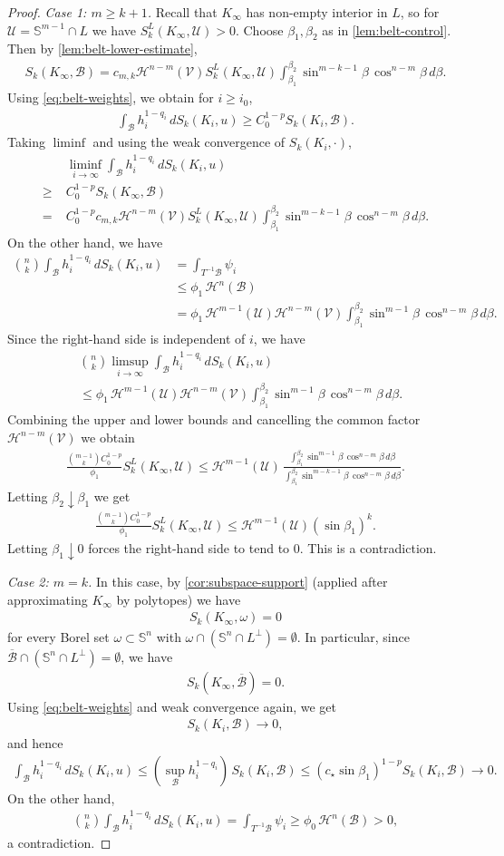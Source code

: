 \documentclass[12pt]{amsart}
\numberwithin{equation}{section}
\newcommand{\ov}{\overline}
\newcommand{\8}{\infty}
\newcommand{\cB}{\mathcal{B}}
\newcommand{\cH}{\mathcal{H}}
\newcommand{\eq}[1]{\begin{equation}\begin{alignedat}{2}#1\end{alignedat}\end{equation}}
\begin{document}
\begin{proof}
\textit{Case 1: $m\ge k+1$.}
Recall that $K_\infty$ has non-empty interior in $L$, so for $\mathcal{U}= \mathbb{S}^{m-1}\cap L$ we have $S^L_k(K_\infty,\mathcal{U})>0$.
Choose $\beta_1,\beta_2$ as in \autoref{lem:belt-control}. Then by \autoref{lem:belt-lower-estimate},
\eq{
S_k(K_\infty,\cB)
= c_{m,k}\cH^{n-m}(\mathcal{V})S_k^L(K_\infty,\mathcal{U})
  \int_{\beta_1}^{\beta_2}\sin^{m-k-1}\beta\,\cos^{n-m}\beta\,d\beta.
}
Using \eqref{eq:belt-weights}, we obtain for $i\ge i_0$,
\eq{
\int_{\cB} h_i^{1-q_i}\,dS_k(K_i,u)
\ge C_0^{1-p} S_k(K_i,\cB).
}
Taking $\liminf$ and using the weak convergence of $S_k(K_i,\cdot)$,
\eq{
&\liminf_{i\to\infty}\int_{\cB} h_i^{1-q_i}\,dS_k(K_i,u)\\
\ge\;& C_0^{1-p} S_k(K_\infty,\cB)\\
=\;& C_0^{1-p} c_{m,k}\cH^{n-m}(\mathcal{V})S_k^L(K_\infty,\mathcal{U})
    \int_{\beta_1}^{\beta_2}\sin^{m-k-1}\beta\,\cos^{n-m}\beta\,d\beta.
}
On the other hand, we have
\eq{
\binom{n}{k}\int_{\cB} h_i^{1-q_i}\,dS_k(K_i,u)
&=\int_{T^{-1}\cB}\psi_i\\
&\le \phi_1\,\cH^n(\cB)\\
&= \phi_1\,\cH^{m-1}(\mathcal{U})\cH^{n-m}(\mathcal{V})
   \int_{\beta_1}^{\beta_2}\sin^{m-1}\beta\,\cos^{n-m}\beta\,d\beta.
}
Since the right-hand side is independent of $i$, we have
\eq{
&\binom{n}{k}\limsup_{i\to\infty}\int_{\cB} h_i^{1-q_i}\,dS_k(K_i,u)\\
&\le \phi_1\,\cH^{m-1}(\mathcal{U})\cH^{n-m}(\mathcal{V})
   \int_{\beta_1}^{\beta_2}\sin^{m-1}\beta\,\cos^{n-m}\beta\,d\beta.
}
Combining the upper and lower bounds and cancelling the common factor
$\cH^{n-m}(\mathcal{V})$ we obtain
\eq{
\frac{\binom{m-1}{k} C_0^{1-p}}{\phi_1} S_k^L(K_\infty,\mathcal{U})
\le \cH^{m-1}(\mathcal{U})\,
   \frac{\int_{\beta_1}^{\beta_2}\sin^{m-1}\beta\,\cos^{n-m}\beta\,d\beta}
        {\int_{\beta_1}^{\beta_2}\sin^{m-k-1}\beta\,\cos^{n-m}\beta\,d\beta}.
}
Letting $\beta_2\downarrow\beta_1$ we get
\eq{
\frac{\binom{m-1}{k} C_0^{1-p}}{\phi_1} S_k^L(K_\infty,\mathcal{U})
\le \cH^{m-1}(\mathcal{U}) (\sin\beta_1)^k.
}
Letting $\beta_1\downarrow 0$ forces the right-hand side to tend to $0$. This is a contradiction.


\textit{Case 2: $m=k$.}
In this case, by \autoref{cor:subspace-support} (applied after approximating $K_\infty$ by polytopes) we have
\eq{
S_k(K_\infty,\omega)=0
}
for every Borel set $\omega\subset\mathbb{S}^{n}$ with
$\omega\cap(\mathbb{S}^{n}\cap L^{\perp})=\emptyset$.
In particular, since $\ov{\cB}\cap(\mathbb{S}^n\cap L^\perp)=\emptyset$, we have
\eq{
S_k(K_\infty,\ov{\cB})=0.
}
Using \eqref{eq:belt-weights} and weak convergence again, we get
\eq{
S_k(K_i,\cB)\to 0,
}
and hence
\eq{
\int_{\cB} h_i^{1-q_i}\,dS_k(K_i,u)
\le (\sup_{\cB} h_i^{1-q_i})\,S_k(K_i,\cB)
\le (c_{\star}\sin\beta_1)^{1-p} S_k(K_i,\cB)\to 0.
}
On the other hand,
\eq{
\binom{n}{k}\int_{\cB} h_i^{1-q_i}\,dS_k(K_i,u)
= \int_{T^{-1}\cB}\psi_i
\ge \phi_0\,\cH^n(\cB)>0,
}
a contradiction.


\end{proof}
\end{document}
